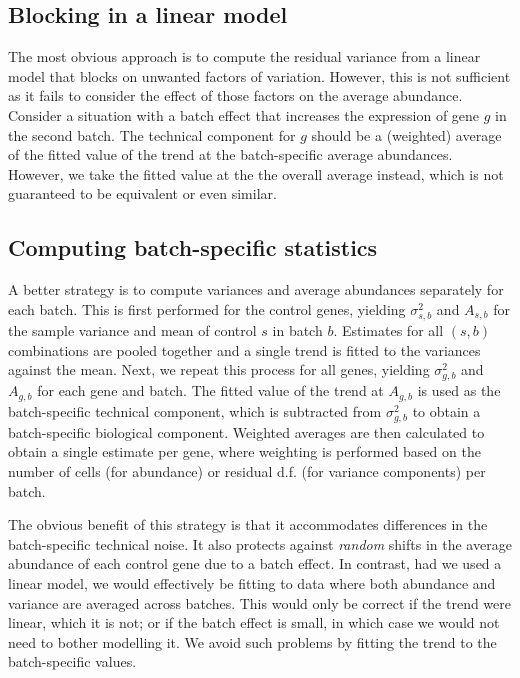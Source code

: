 \documentclass{article}
\begin{document}
\subsection{Blocking in a linear model}
The most obvious approach is to compute the residual variance from a linear model that blocks on unwanted factors of variation.
However, this is not sufficient as it fails to consider the effect of those factors on the average abundance.
Consider a situation with a batch effect that increases the expression of gene $g$ in the second batch.
The technical component for $g$ should be a (weighted) average of the fitted value of the trend at the batch-specific average abundances.
However, we take the fitted value at the the overall average instead, which is not guaranteed to be equivalent or even similar.

\subsection{Computing batch-specific statistics}
A better strategy is to compute variances and average abundances separately for each batch.
This is first performed for the control genes, yielding $\sigma^2_{s,b}$ and $A_{s,b}$ for the sample variance and mean of control $s$ in batch $b$.
Estimates for all $(s, b)$ combinations are pooled together and a single trend is fitted to the variances against the mean.
Next, we repeat this process for all genes, yielding $\sigma^2_{g,b}$ and $A_{g,b}$ for each gene and batch.
The fitted value of the trend at $A_{g,b}$ is used as the batch-specific technical component, which is subtracted from $\sigma^2_{g,b}$ to obtain a batch-specific biological component.
Weighted averages are then calculated to obtain a single estimate per gene, where weighting is performed based on the number of cells (for abundance) or residual d.f. (for variance components) per batch.

The obvious benefit of this strategy is that it accommodates differences in the batch-specific technical noise.
It also protects against \textit{random} shifts in the average abundance of each control gene due to a batch effect.
In contrast, had we used a linear model, we would effectively be fitting to data where both abundance and variance are averaged across batches.
This would only be correct if the trend were linear, which it is not;
or if the batch effect is small, in which case we would not need to bother modelling it.
We avoid such problems by fitting the trend to the batch-specific values.
\end{document}
